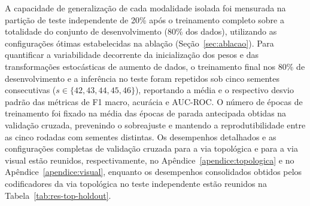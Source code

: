 A capacidade de generalização de cada modalidade isolada foi mensurada na partição de teste independente de 20\% após o treinamento completo sobre a totalidade do conjunto de desenvolvimento (80\% dos dados), utilizando as configurações ótimas estabelecidas na ablação (Seção~\ref{sec:ablacao}). Para quantificar a variabilidade decorrente da inicialização dos pesos e das transformações estocásticas de aumento de dados, o treinamento final nos 80\% de desenvolvimento e a inferência no teste foram repetidos sob cinco sementes consecutivas ($s \in \{42, 43, 44, 45, 46\}$), reportando a média e o respectivo desvio padrão das métricas de F1 macro, acurácia e AUC-ROC. O número de épocas de treinamento foi fixado na média das épocas de parada antecipada obtidas na validação cruzada, prevenindo o sobreajuste e mantendo a reprodutibilidade entre as cinco rodadas com sementes distintas. Os desempenhos detalhados e as configurações completas de validação cruzada para a via topológica e para a via visual estão reunidos, respectivamente, no Apêndice~\ref{apendice:topologica} e no Apêndice~\ref{apendice:visual}, enquanto os desempenhos consolidados obtidos pelos codificadores da via topológica no teste independente estão reunidos na Tabela~\ref{tab:res-top-holdout}.

\begin{table}[htb]
\centering
\caption{F1 macro (média $\pm$ desvio padrão ao longo de 5 sementes) no conjunto de teste independente (20\% dos dados) para os codificadores da via topológica.}
\label{tab:res-top-holdout}
\small
{}
\end{table}

